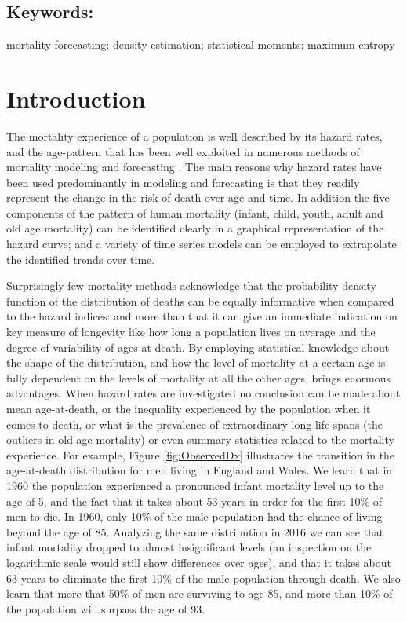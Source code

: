 \documentclass[T0_MEM]{subfiles}
\begin{document}
\subsection*{Keywords:}
mortality forecasting; density estimation; statistical moments; maximum entropy

\section{Introduction}\label{sec:Intro}

The mortality experience of a population is well described by its hazard rates, and the age-pattern that has been well exploited in numerous methods of mortality modeling \citep{gompertz1825, makeham1867, siler1983, heligman1980} and forecasting \citep{lee1992, li2005, haberman2014}. The main reasons why hazard rates have been used predominantly in modeling and forecasting is that they readily represent the change in the risk of death over age and time. In addition the five components of the pattern of human mortality (infant, child, youth, adult and old age mortality) can be identified clearly in a graphical representation of the hazard curve; and a variety of time series models can be employed to extrapolate the identified trends over time.

Surprisingly few mortality methods acknowledge that the probability density function of the distribution of deaths can be equally informative when compared to the hazard indices: and more than that it can give an immediate indication on key measure of longevity like how long a population lives on average and the degree of variability of ages at death. By employing statistical knowledge about the shape of the distribution, and how the level of mortality at a certain age is fully dependent on the levels of mortality at all the other ages, brings enormous advantages. When hazard rates are investigated no conclusion can be made about mean age-at-death, or the inequality experienced by the population when it comes to death, or what is the prevalence of extraordinary long life spans (the outliers in old age mortality) or even summary statistics related to the mortality experience. For example, Figure \ref{fig:ObservedDx} illustrates the transition in the age-at-death distribution for men living in England and Wales. We learn that in 1960 the population experienced a pronounced infant mortality level up to the age of 5, and the fact that it takes about 53 years in order for the first 10\% of men to die. In 1960, only 10\% of the male population had the chance of living beyond the age of 85. Analyzing the same distribution in 2016 we can see that infant mortality dropped to almost insignificant levels (an inspection on the logarithmic scale would still show differences over ages), and that it takes about 63 years to eliminate the first 10\% of the male population through death. We also learn that more that 50\% of men are surviving to age 85, and more than 10\% of the population will surpass the age of 93.
\end{document}
